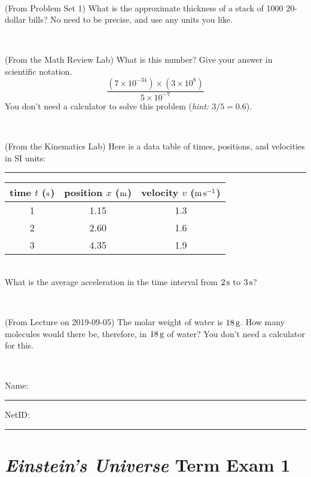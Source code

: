\documentclass[12pt, letterpaper]{article}
\begin{document}
\vfill ~


\clearpage


\begin{problem} (From Problem Set 1)
What is the approximate thickness of a stack of 1000 20-dollar bills?
No need to be precise, and use any units you like.
\end{problem}


\vfill ~

\begin{problem} (From the Math Review Lab)
What is this number? Give your answer in scientific notation.
$$
\frac{(7\times10^{-34})\times(3\times10^8)}{5\times10^{-7}}
$$
You don't need a calculator to solve this problem (\textit{hint: $3/5=0.6$}).
\end{problem}


\vfill ~

\begin{problem} (From the Kinematics Lab)
Here is a data table of times, positions, and velocities in SI units:\\
\rule{1.0in}{0pt}\begin{tabular}{c|c|c}
time $t$ ($\mathrm{s}$) & position $x$ ($\mathrm{m}$) & velocity $v$ ($\mathrm{m}\,\mathrm{s}^{-1}$) \\
\hline
1 & 1.15 & 1.3 \\
2 & 2.60 & 1.6 \\
3 & 4.35 & 1.9 \\
\hline
\end{tabular}\\
What is the average acceleration in the time interval from $2\,\mathrm{s}$ to $3\,\mathrm{s}$?
\end{problem}


\vfill ~

\begin{problem} (From Lecture on 2019-09-05)
The molar weight of water is $18\,\mathrm{g}$. How many molecules would there
be, therefore, in $18\,\mathrm{g}$ of water? You don't need a calculator for
this.
\end{problem}


\vfill ~


\cleardoublepage



\noindent
Name: \rule[-1ex]{0.60\textwidth}{0.1pt}
NetID: \rule[-1ex]{0.20\textwidth}{0.1pt}

\section*{\textsl{Einstein's Universe} Term Exam 1}
\setcounter{problem}{1}
\end{document}
